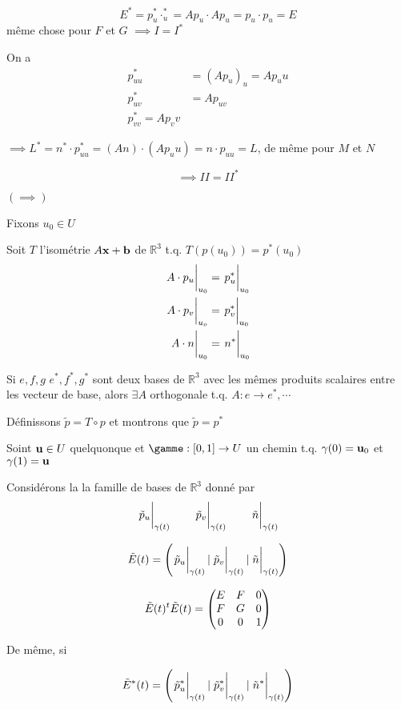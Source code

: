 $$E^* = p_{u}^*\cdotp_{u}^* = Ap_{u} \cdot Ap_{u} = p_{u} \cdot p_{u} =E$$ 
même chose pour $F$ et $G$ $\implies I = I^*$

On a
 $$\begin{aligned}
	 p_{uu}^* &= (Ap_u)_u = Ap_uu\\
	 p_{uv}^* &= Ap_{uv} \\
	 p_{vv}^* = Ap_vv
 \end{aligned}$$ 


 $\implies L^* = n^*\cdot p_{uu}^* = (An)\cdot (Ap_uu) =n\cdot p_{uu} = L$, de même pour $M$ et $N$   


 $$\implies II = II^*$$ 

$(\implies)$ 

Fixons $u_{0} \in U$ 

Soit $T$ l'isométrie $A\vb{x}+ \vb{b}$ de $\mathbb{R}^{3} $ t.q. $T(p(u_{0} )) = p^*(u_0) $  
$$\begin{aligned}
	\eval{A\cdot p_{u} }_{u_0} &=\eval{p_{u}^*}_{u_0}\\
	\eval{A\cdot p_v}_{u_o} &= \eval{p_{v}^*}_{u_0}\\
	\eval{A\cdot n}_{u_{0} } &= \eval{n^*}_{u_0} 
\end{aligned}$$ 


\begin{tcolorbox}
	Si $e,f,g$ $e^*, f^*, g^*$ sont deux bases de $\mathbb{R}^{3} $ avec les mêmes produits scalaires entre les vecteur de base, alors $\exists A$ orthogonale t.q. $A: e \to e^*, \dotsb$     
\end{tcolorbox}

Définissons $\tilde{p} = T \circ p$ et montrons que $\tilde{p} = p^*$

Soint $\vb{u} \in U$ quelquonque et $\gamme: [0,1] \to U$ un chemin t.q. $\gamma(0) = \vb{u}_{0}  $ et $\gamma(1) = \vb{u}$ 


Considérons la la famille de bases de $\mathbb{R}^{3} $ donné par 
$$\eval{\tilde p_{u} }_{\gamma(t)} \qquad \eval{\tilde p_v}_{\gamma(t)} \qquad \eval{\tilde n}_{\gamma(t)} $$ 

$$\tilde E (t) = \left(\eval{\tilde p_{u} }_{\gamma(t)} | \eval{\tilde p_v}_{\gamma(t)} | \eval{\tilde n}_{\gamma(t)} \right)$$ 

$$\tilde E(t)^t \tilde E(t) = \begin{pmatrix} E &F &0\\ F & G &0\\ 0&0&1 \end{pmatrix}$$ 

De même, si 

$$\tilde E^* (t) = \left(\eval{\tilde p_{u}^* }_{\gamma(t)} | \eval{\tilde p_v^*}_{\gamma(t)} | \eval{\tilde n^*}_{\gamma(t)} \right)$$ 

